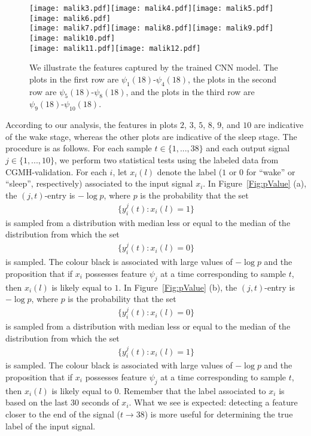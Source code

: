 \documentclass[10pt,a4paper,english]{amsart}
\begin{document}
\begin{figure*}
\centering
\texttt{[image: malik3.pdf]}\texttt{[image: malik4.pdf]}\texttt{[image: malik5.pdf]}\texttt{[image: malik6.pdf]}\\
\texttt{[image: malik7.pdf]}\texttt{[image: malik8.pdf]}\texttt{[image: malik9.pdf]}\texttt{[image: malik10.pdf]}\\
\texttt{[image: malik11.pdf]}\texttt{[image: malik12.pdf]}
\caption{\label{Fig:Features}We illustrate the features captured by the trained CNN model. The plots in the first row are $\psi_1(18)$-$\psi_4(18)$, the plots in the second row are $\psi_5(18)$-$\psi_8(18)$, and the plots in the third row are $\psi_9(18)$-$\psi_{10}(18)$.}
\end{figure*}


 According to our analysis, the features in plots $2$, $3$, $5$, $8$, $9$, and $10$ are indicative of the wake stage, whereas the other plots are indicative of the sleep stage.  The procedure is as follows. For each sample $t \in \{1, ..., 38\}$ and each output signal $j \in \{1, ..., 10\}$, we perform two statistical tests using the labeled data from CGMH-validation.  For each $i$, let $x_i(l)$ denote the label ($1$ or $0$ for ``wake'' or ``sleep'', respectively) associated to the input signal $x_i$. In Figure~\ref{Fig:pValue} (a), the $(j, t)$-entry is ${-\log} p$, where $p$ is the probability that the set
\begin{gather}
 \{y_i^j(t) : x_i(l) = 1\} 
 \end{gather}
 is sampled from a distribution with median less or equal to the median of the distribution from which the set
 \begin{gather}
 \{y_i^j(t) : x_i(l) = 0\}
 \end{gather}
 is sampled. The colour black is associated with large values of $-\log p$ and the proposition that if $x_i$ possesses feature $\psi_j$ at a time corresponding to sample $t$, then $x_i(l)$ is likely equal to $1$. In Figure~\ref{Fig:pValue} (b), the $(j, t)$-entry is ${-\log} p$, where $p$ is the probability that the set
\begin{gather}
 \{y_i^j(t) : x_i(l) = 0\} 
 \end{gather}
 is sampled from a distribution with median less or equal to the median of the distribution from which the set
 \begin{gather}
 \{y_i^j(t) : x_i(l) = 1\}
 \end{gather}
 is sampled. The colour black is associated with large values of $-\log p$ and the proposition that if $x_i$ possesses feature $\psi_j$ at a time corresponding to sample $t$, then $x_i(l)$ is likely equal to $0$. Remember that the label associated to $x_i$ is based on the last $30$ seconds of $x_i$.  What we see is expected: detecting a feature closer to the end of the signal ($t \rightarrow 38$) is more useful for determining the true label of the input signal. 
 
\end{document}
